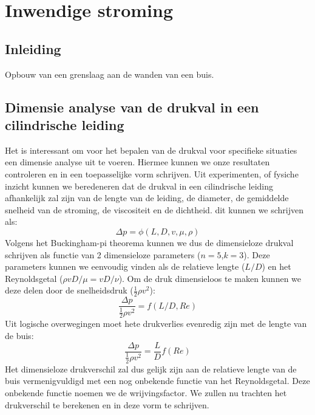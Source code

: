 \FloatBarrier
\chapter{Inwendige stroming}
\label{sec:Inwendige stroming}

	\FloatBarrier
	\section{Inleiding}
	\label{sec:Inwendige stroming Inleiding}

Opbouw van een grenslaag aan de wanden van een buis.
	\FloatBarrier
	\section{Dimensie analyse van de drukval in een cilindrische leiding}
	\label{sec:Dimensie analyse van de drukval in een cilindrische leiding}
Het is interessant om voor het bepalen van de drukval voor specifieke situaties een dimensie analyse uit te voeren. Hiermee kunnen we onze resultaten controleren en in een toepasselijke vorm schrijven.
\npar
Uit experimenten, of fysiche inzicht kunnen we beredeneren dat de drukval in een cilindrische leiding afhankelijk zal zijn van de lengte van de leiding, de diameter, de gemiddelde snelheid van de stroming, de viscositeit en de dichtheid.
dit kunnen we schrijven als:
\begin{equation}
	\Delta p = \phi(L,D,v,\mu,\rho)
\end{equation}
Volgens het Buckingham-pi theorema kunnen we dus de dimensieloze drukval schrijven als functie van 2 dimensieloze parameters ($n=5$,$k=3$). Deze parameters kunnen we eenvoudig vinden als de relatieve lengte ($L/D$) en het Reynoldsgetal ($\rho v D/\mu = v D/\nu$). Om de druk dimensieloos te maken kunnen we deze delen door de snelheidsdruk ($\frac{1}{2} \rho v^2$):
\begin{equation}
	\frac{\Delta p}{\frac{1}{2}\rho v^2} = f(L/D,Re)
\end{equation}
Uit logische overwegingen moet hete drukverlies evenredig zijn met de lengte van de buis:
\begin{equation}
	\frac{\Delta p}{\frac{1}{2}\rho v^2} = \frac{L}{D} f(Re)
	\label{eqn:dimensie analyse drukval laminair}
\end{equation}
Het dimensieloze drukverschil zal dus gelijk zijn aan de relatieve lengte van de buis vermenigvuldigd met een nog onbekende functie van het Reynoldsgetal. Deze onbekende functie noemen we de wrijvingsfactor. We zullen nu trachten het drukverschil te berekenen en in deze vorm te schrijven.
	

